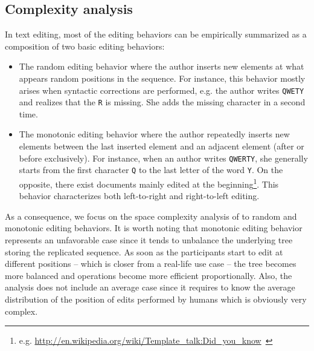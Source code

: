 \subsection{Complexity analysis}
\label{subsec:complexity}

In text editing, most of the editing behaviors can be empirically summarized as
a composition of two basic editing behaviors:
\begin{itemize}[noitemsep, leftmargin=*]
\item The random editing behavior where the author inserts new elements at what
  appears random positions in the sequence. For instance, this behavior mostly
  arises when syntactic corrections are performed, e.g. the author writes
  \texttt{QWETY} and realizes that the \texttt{R} is missing. She adds the
  missing character in a second time.
\item The monotonic editing behavior where the author repeatedly inserts new
  elements between the last inserted element and an adjacent element (after or
  before exclusively). For instance, when an author writes \texttt{QWERTY}, she
  generally starts from the first character \texttt{Q} to the last letter of the
  word \texttt{Y}. On the opposite, there exist documents mainly edited at the
  beginning\footnote{e.g. \url{http://en.wikipedia.org/wiki/Template_talk:Did_you_know}~\cite{nedelec2013lseq}}. This
  behavior characterizes both left-to-right and right-to-left editing.
\end{itemize}

\noindent As a consequence, we focus on the space complexity analysis of \LSEQ
to random and monotonic editing behaviors. It is worth noting that monotonic
editing behavior represents an unfavorable case since it tends to unbalance the
underlying tree storing the replicated sequence. As soon as the participants
start to edit at different positions -- which is closer from a real-life use
case -- the tree becomes more balanced and operations become more efficient
proportionally. Also, the analysis does not include an average case since it
requires to know the average distribution of the position of edits performed by
humans which is obviously very complex.

